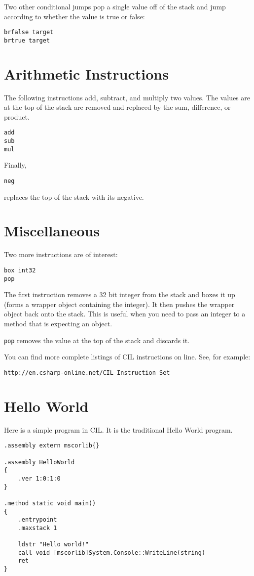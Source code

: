 \documentclass[10pt,a4paper]{amsart}
\begin{document}
Two other conditional jumps pop a single value off of the stack and jump according to whether the
value is true or false:

\begin{verbatim}
brfalse target
brtrue target
\end{verbatim}


\section{Arithmetic Instructions}

The following instructions add, subtract, and multiply two values. The values are at the top of the stack
are removed and replaced by the sum, difference, or product.

\begin{verbatim}
add
sub
mul
\end{verbatim}

Finally, 
\begin{verbatim}
neg
\end{verbatim}
replaces the top of the stack with its negative.


\section{Miscellaneous}

Two more instructions are of interest:
\begin{verbatim}
box int32
pop
\end{verbatim}
The first instruction removes a 32 bit integer from the stack and boxes it up (forms a wrapper object 
containing the integer). It then pushes the wrapper object back onto the stack. This is useful
when you need to pass an integer to a method that is expecting an object.

{\tt pop} removes the value at the top of the stack and discards it. 




You can find more complete listings 
of CIL instructions on line. See, for example:

\begin{verbatim}
http://en.csharp-online.net/CIL_Instruction_Set
\end{verbatim}


\section{Hello World}

Here is a simple program in CIL. It is the traditional Hello World program.
\begin{verbatim}
.assembly extern mscorlib{}

.assembly HelloWorld
{
    .ver 1:0:1:0
}

.method static void main()
{
    .entrypoint
    .maxstack 1

    ldstr "Hello world!"
    call void [mscorlib]System.Console::WriteLine(string)
    ret
}
\end{verbatim}
\end{document}

